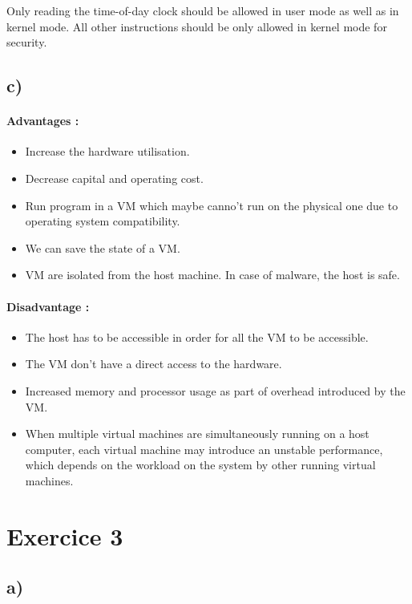 \documentclass[a4paper,11pt]{report}
\begin{document}
Only reading the time-of-day clock should be allowed in user mode as well as in
kernel mode. All other instructions should be only allowed in kernel mode for
security.

\subsection*{c)}

\paragraph{Advantages :}
\begin{itemize}
\item Increase the hardware utilisation.
\item Decrease capital and operating cost.
\item Run program in a VM which maybe canno't run on the physical one due to
  operating system compatibility.
\item We can save the state of a VM.
\item VM are isolated from the host machine. In case of malware, the host is safe.
\end{itemize}

\paragraph{Disadvantage :}
\begin{itemize}
\item The host has to be accessible in order for all the VM to be accessible.
\item The VM don't have a direct access to the hardware.
\item Increased memory and processor usage as part of overhead introduced by the VM.
\item When multiple virtual machines are simultaneously running on a host
  computer, each virtual machine may introduce an unstable performance, which
  depends on the workload on the system by other running virtual machines.
\end{itemize}

\section*{Exercice 3}

\subsection*{a)}
\end{document}
